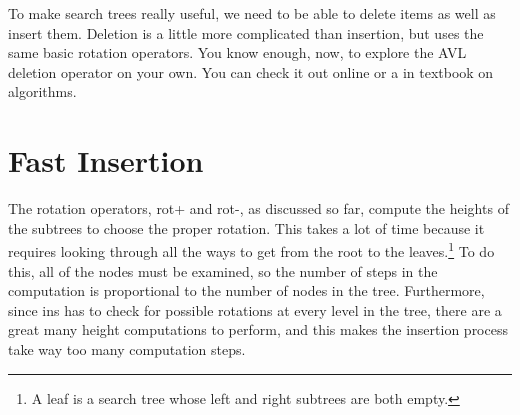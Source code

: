 To make search trees really useful, we need to be able to delete items
as well as insert them.
Deletion is a little more complicated than
insertion, but uses the same basic rotation operators.
You know enough, now, to explore the AVL deletion operator on your own.
You can check it out online or a in textbook on algorithms.

\begin{exercises}




\end{exercises}

\section{Fast Insertion}

The rotation operators, \textsf{rot}+ and \textsf{rot-}, as discussed so far,
compute the heights of the subtrees to choose the proper rotation.
This takes a lot of time because it requires
looking through all the ways to get from the root to the leaves.\footnote{A
leaf is a search tree whose left and right subtrees are both empty.}
To do this, all of the nodes must be examined, so the number of steps in
the computation is proportional to the number of nodes in the tree.
Furthermore, since \textsf{ins} has to check
for possible rotations at every level in the
tree, there are a great many height computations to perform, and this
makes the insertion process take way too many computation steps.


